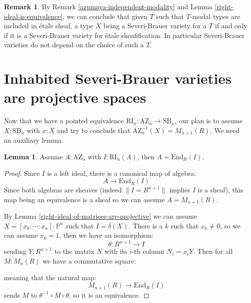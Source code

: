 \documentclass[10pt,a4paper]{article}
\theoremstyle{definition}
\newtheorem{lemma}[theorem]{Lemma}
\newtheorem{remark}[theorem]{Remark}
\newcommand{\SB}{\mathrm{SB}}
\newcommand{\RI}{\mathrm{RI}}
\newcommand{\AZ}{\mathrm{AZ}}
\newcommand{\propTrunc}[1]{\lVert #1 \rVert}
\newcommand{\bP}{\mathbb{P}}
\begin{document}
\begin{remark}\label{severi-brauer-independent-modality}
By Remark \ref{azumaya-independent-modality} and Lemma \ref{right-ideal-is-equivalence}, we can conclude that given $T$ such that $T$-modal types are included in étale sheaf, a type $X$ being a Severi-Brauer variety for a $T$ if and only if it is a Severi-Brauer variety for étale sheafification. In particular Severi-Brauer varieties do not depend on the choice of such a $T$.
\end{remark}


\section{Inhabited Severi-Brauer varieties are projective spaces}

Now that we have a pointed equivalence $\RI_n:\AZ_n \to \SB_n$, our plan is to assume $X:\SB_n$ with $x:X$ and try to conclude that $\AZ_n^{-1}(X) = M_{n+1}(R)$. We need an auxiliary lemma.

\begin{lemma}\label{azumaya-with-right-ideal}
Assume $A:\AZ_n$ with $I:\RI_n(A)$, then $A = \mathrm{End}_R(I)$.
\end{lemma}

\begin{proof}
Since $I$ is a left ideal, there is a canonical map of algebra:
\[A \to\mathrm{End}_R(I)\]
Since both algebras are sheaves (indeed $\propTrunc{I=R^{n+1}}$ implies $I$ is a sheaf), this map being an equivalence is a sheaf so we can assume $A=M_{n+1}(R)$.

By Lemma \ref{right-ideal-of-matrices-are-projective} we can assume $X=[x_0:\cdots:x_n]:\bP^n$ such that $I=\delta(X)$. There is a $k$ such that $x_k\not=0$, so we can assume $x_k=1$, then we have an isomorphism:
\[\theta:R^{n+1}\to I\]
sending $Y:R^{n+1}$ to the matrix $N$ with its $i$-th column $N_i=x_iY$. Then for all $M:M_n(R)$ we have a commutative square:
\begin{center}
\end{center}
meaning that the natural map:
\[ M_{n+1}(R)\to \mathrm{End}_R(I)\]
sends $M$ to $\theta^{-1}\circ M\circ\theta$, so it is an equivalence.
\end{proof}
\end{document}
